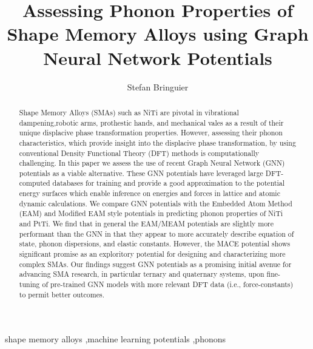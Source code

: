 \documentclass[preprint]{elsarticle}
\begin{document}
\title{Assessing Phonon Properties of Shape Memory Alloys using Graph Neural Network Potentials}

\author[1]{Stefan Bringuier}

\begin{abstract}
Shape Memory Alloys (SMAs) such as NiTi are pivotal in vibrational dampening,robotic arms, prothestic hands, and mechanical vales as a result of their unique displacive phase transformation properties. However, assessing their phonon characteristics, which provide insight into the displacive phase transformation, by using conventional Density Functional Theory (DFT) methods is computationally challenging. In this paper we assess the use of recent Graph Neural Network (GNN) potentials as a viable alternative. These GNN potentials have leveraged large DFT-computed databases for training and provide a good approximation to the potential energy surfaces which enable inference on energies and forces in lattice and atomic dynamic calculations. We compare GNN potentials with the Embedded Atom Method (EAM) and Modified EAM style potentials in predicting phonon properties of NiTi and PtTi. We find that in general the EAM/MEAM potentials are slightly more performant than the GNN in that they appear to more accurately describe equation of state, phonon dispersions, and elastic constants. However, the MACE potential shows significant promise as an exploritory potential for designing and characterizing more complex SMAs. Our findings suggest GNN potentials as a promising initial avenue for advancing SMA research, in particular ternary and quaternary systems, upon fine-tuning of pre-trained GNN models with more relevant DFT data (i.e., force-constants) to permit better outcomes.   
\end{abstract}

\begin{keyword}
  shape memory alloys \sep machine learning potentials \sep phonons
\end{keyword}


\maketitle

\end{document}
